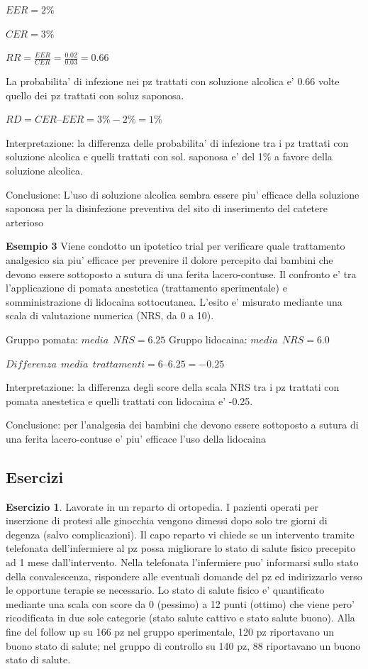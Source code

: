 \documentclass[]{book}
\begin{document}
\(EER= 2\%\)

\(CER= 3\%\)

\(RR = \frac{EER} {CER} = \frac{0.02}{0.03} = 0.66\)

La probabilita' di infezione nei pz trattati con soluzione alcolica e' 0.66 volte quello dei pz trattati con soluz saponosa.

\(RD = CER – EER = 3\%-2\% = 1\%\)

Interpretazione: la differenza delle probabilita' di infezione tra i pz trattati con soluzione alcolica e quelli trattati con sol. saponosa e' del 1\% a favore della soluzione alcolica.

Conclusione: L'uso di soluzione alcolica sembra essere piu' efficace della soluzione saponosa per la disinfezione preventiva del sito di inserimento del catetere arterioso

\textbf{Esempio 3}
Viene condotto un ipotetico trial per verificare quale trattamento analgesico sia piu' efficace per prevenire il dolore percepito dai bambini che devono essere sottoposto a sutura di una ferita lacero-contuse.
Il confronto e' tra l'applicazione di pomata anestetica (trattamento sperimentale) e somministrazione di lidocaina sottocutanea.
L'esito e' misurato mediante una scala di valutazione numerica (NRS, da 0 a 10).

Gruppo pomata: \(media\ \ NRS = 6.25\)
Gruppo lidocaina: \(media\ \ NRS = 6.0\)

\(Differenza \ \ media \ \ trattamenti = 6 – 6.25 = -0.25\)

Interpretazione: la differenza degli score della scala NRS tra i pz trattati con pomata anestetica e quelli trattati con lidocaina e' -0.25.

Conclusione: per l'analgesia dei bambini che devono essere sottoposto a sutura di una ferita lacero-contuse e' piu' efficace l'uso della lidocaina

\hypertarget{esercizi-2}{%
\subsection{Esercizi}\label{esercizi-2}}

\textbf{Esercizio 1}. Lavorate in un reparto di ortopedia. I pazienti operati per inserzione di protesi alle ginocchia vengono dimessi dopo solo tre giorni di degenza (salvo complicazioni). Il capo reparto vi chiede se un intervento tramite telefonata dell'infermiere al pz possa migliorare lo stato di salute fisico precepito ad 1 mese dall'intervento. Nella telefonata l'infermiere puo' informarsi sullo stato della convalescenza, rispondere alle eventuali domande del pz ed indirizzarlo verso le opportune terapie se necessario. Lo stato di salute fisico e' quantificato mediante una scala con score da 0 (pessimo) a 12 punti (ottimo) che viene pero' ricodificata in due sole categorie (stato salute cattivo e stato salute buono).
Alla fine del follow up su 166 pz nel gruppo sperimentale, 120 pz riportavano un buono stato di salute; nel gruppo di controllo su 140 pz, 88 riportavano un buono stato di salute.
\end{document}
